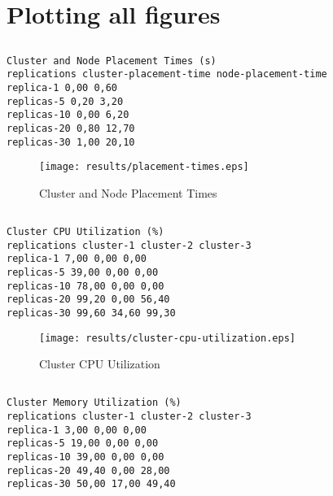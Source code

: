 \documentclass{elsart}
\begin{document}
\section{Plotting all figures}
\subsection{}

\begin{lstlisting}[caption={Cluster and Node Placement Times}]
Cluster and Node Placement Times (s)
replications cluster-placement-time node-placement-time
replica-1 0,00 0,60
replicas-5 0,20 3,20
replicas-10 0,00 6,20
replicas-20 0,80 12,70
replicas-30 1,00 20,10
\end{lstlisting}

\begin{figure}[ht]
\centering
\texttt{[image: results/placement-times.eps]}
\caption{Cluster and Node Placement Times}\label{fig:placement-times.eps}
\end{figure}

\subsection{}

\begin{lstlisting}[caption={Cluster CPU Utilization}]
Cluster CPU Utilization (%)
replications cluster-1 cluster-2 cluster-3
replica-1 7,00 0,00 0,00
replicas-5 39,00 0,00 0,00
replicas-10 78,00 0,00 0,00
replicas-20 99,20 0,00 56,40
replicas-30 99,60 34,60 99,30
\end{lstlisting}

\begin{figure}[ht]
\centering
\texttt{[image: results/cluster-cpu-utilization.eps]}
\caption{Cluster CPU Utilization}\label{fig:cluster-cpu-utilization.eps}
\end{figure}

\subsection{}

\begin{lstlisting}[caption={Cluster Memory Utilization}]
Cluster Memory Utilization (%)
replications cluster-1 cluster-2 cluster-3
replica-1 3,00 0,00 0,00
replicas-5 19,00 0,00 0,00
replicas-10 39,00 0,00 0,00
replicas-20 49,40 0,00 28,00
replicas-30 50,00 17,00 49,40
\end{lstlisting}
\end{document}
